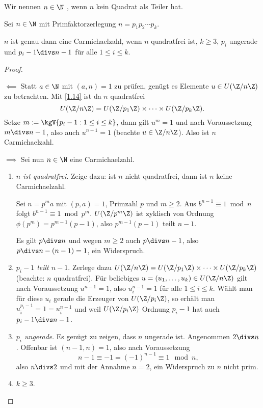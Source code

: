 \begin{df*}
	Wir nennen $n \in \N$ , wenn $n$ kein Quadrat als Teiler hat.
\end{df*}

\begin{st}[Korselt, 1899] \label{3.8}
	Sei $n \in \N$ mit Primfaktorzerlegung $n = p_1 p_2 \dotsb p_k$.

	$n$ ist genau dann eine Carmichaelzahl, wenn $n$ quadratfrei ist, $k \ge 3$, $p_i$ ungerade und $p_i-1 \divs n-1$ für alle $1 \le i \le k$.
	\begin{proof}
		\begin{segnb}{$\impliedby$}
			Statt $a \in \N$ mit $(a, n) = 1$ zu prüfen, genügt es Elemente $u \in U(\Z / n\Z)$ zu betrachten.
			Mit \ref{1.14} ist da $n$ quadratfrei
			\[
				U(\Z / n\Z) = U(\Z / p_1\Z) \times \dotsb \times U(\Z / p_k \Z).
			\]
			Setze $m := \kgV \{ p_i - 1 : 1 \le i \le k \}$, dann gilt $u^m = 1$ und nach Voraussetzung $m \divs n - 1$, also auch $u^{n-1} = 1$ (beachte $u \in \Z / n\Z$).
			Also ist $n$ Carmichaelzahl.
		\end{segnb}
		\begin{segnb}{$\implies$}
			Sei nun $n \in \N$ eine Carmichaelzahl.
			\begin{enumerate}[1.]
				\item
					\emph{$n$ ist  quadratfrei}.
					Zeige dazu: ist $n$ nicht quadratfrei, dann ist $n$ keine Carmichaelzahl.

					Sei $n = p^m a$ mit $(p,a) = 1$, Primzahl $p$ und $m \ge 2$.
					Aus $b^{n-1} \equiv 1 \bmod n$ folgt $b^{n-1} \equiv 1 \bmod p^m$.
					$U(\Z / p^m \Z)$ ist zyklisch von Ordnung $\phi(p^m) = p^{m-1} (p-1)$, also $p^{m-1} (p-1)$ teilt $n-1$.

					Es gilt $p \divs n$ und wegen $m \ge 2$ auch $p \divs n-1$, also $p \divs n - (n-1) = 1$, ein Widerspruch.
				\item
					\emph{$p_i - 1$ teilt $n - 1$}.
					Zerlege dazu $U(\Z / n\Z) = U(\Z / p_1 \Z) \times \dotsb \times U(\Z / p_k \Z)$ (beachte: $n$ quadratfrei).
					Für beliebiges $u = (u_1, \dotsc, u_k) \in U(\Z / n\Z)$ gilt nach Voraussetzung $u^{n-1} = 1$, also $u_i^{n-1} = 1$ für alle $1 \le i \le k$.
					Wählt man für diese $u_i$ gerade die Erzeuger von $U(\Z / p_i\Z)$, so erhält man $u_i^{p_i-1} = 1 = u_i^{n-1}$ und weil $U(\Z / p_i \Z)$ Ordnung $p_i - 1$ hat auch $p_i - 1 \divs n - 1$.
				\item
					\emph{$p_i$ ungerade}.
					Es genügt zu zeigen, dass $n$ ungerade ist.
					Angenommen $2 \divs n$.
					Offenbar ist $(n - 1, n) = 1$, also nach Voraussetzung
					\[
						n - 1 \equiv -1 = (-1)^{n-1} \equiv 1 \mod n,
					\]
					also $n \divs 2$ und mit der Annahme $n = 2$, ein Widerspruch zu $n$ nicht prim.
				\item
					\emph{$k \ge 3$}.
			\end{enumerate}
		\end{segnb}
	\end{proof}
\end{st}

